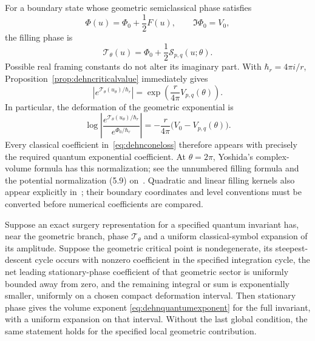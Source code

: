 For a boundary state whose geometric semiclassical phase satisfies
\[
 \Phi(u)=\Phi_0+\frac12F(u),\qquad \Im\Phi_0=V_0,
\]
the filling phase is
\begin{equation}
 \mathcal T_\theta(u)=\Phi_0+\frac12\mathcal S_{p,q}(u;\theta).
 \label{eq:dehnquantumphase}
\end{equation}
Possible real framing constants do not alter its imaginary part.
With $\hbar_r=4\pi i/r$, Proposition~\ref{prop:dehncriticalvalue}
immediately gives
\begin{equation}
 \left|e^{\mathcal T_\theta(u_\theta)/\hbar_r}\right|
   =\exp\left(\frac{r}{4\pi}V_{p,q}(\theta)\right).
 \label{eq:dehnquantumexponent}
\end{equation}
In particular, the deformation of the geometric exponential is
\begin{equation}
 \log\left|\frac{e^{\mathcal T_\theta(u_\theta)/\hbar_r}}
                         {e^{\Phi_0/\hbar_r}}\right|
       =-\frac{r}{4\pi}\bigl(V_0-V_{p,q}(\theta)\bigr).
 \label{eq:dehnquantumresponse}
\end{equation}
Every classical coefficient in~\eqref{eq:dehnconeloss} therefore
appears with precisely the required quantum exponential coefficient.
At $\theta=2\pi$, Yoshida's complex-volume formula has this
normalization; see the unnumbered filling formula and the potential
normalization (5.9) on~\cite[p.~456]{WongYangDehn}.
Quadratic and linear filling kernels also appear explicitly
in~\cite[equations (12)--(14)]{GangRomoYamazaki}; their boundary
coordinates and level conventions must be converted before numerical
coefficients are compared.

\begin{proposition}
\label{prop:dehnquantumconditional}
Suppose an exact surgery representation for a specified quantum
invariant has, near the geometric branch, phase
$\mathcal T_\theta$ and a uniform classical-symbol expansion of
its amplitude. Suppose the geometric critical point is nondegenerate,
its steepest-descent cycle occurs with nonzero coefficient in the
specified integration cycle, the net leading stationary-phase
coefficient of that geometric sector is uniformly bounded away
from zero, and the remaining integral or sum is
exponentially smaller, uniformly on a chosen compact deformation
interval. Then stationary phase gives the volume exponent
\eqref{eq:dehnquantumexponent} for the full invariant, with a
uniform expansion on that interval. Without the last global
condition, the same statement holds for the specified local
geometric contribution.
\end{proposition}

